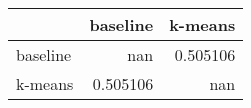 \begin{tabular}{lrr}
\toprule
          &   baseline &    k-means \\
\midrule
 baseline & nan        &   0.505106 \\
 k-means  &   0.505106 & nan        \\
\bottomrule
\end{tabular}